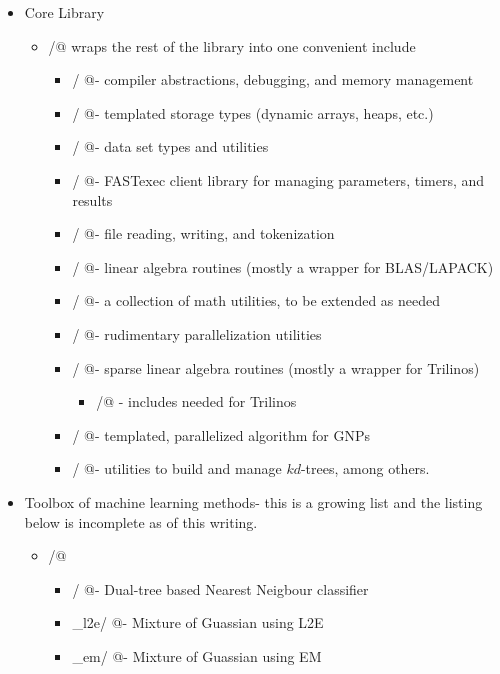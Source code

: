 \documentclass[letter]{report}
\begin{document}
\begin{itemize}

\item Core Library
  \begin{itemize}
  \item \verb@fastlib/@ wraps the rest of the library into one convenient include
    \begin{itemize}
    \item \verb@base/   @- compiler abstractions, debugging, and memory management
    \item \verb@col/    @- templated storage types (dynamic arrays, heaps, etc.)
    \item \verb@data/   @- data set types and utilities
    \item \verb@fx/     @- FASTexec client library for managing parameters, timers, and results
    \item \verb@file/   @- file reading, writing, and tokenization
    \item \verb@la/     @- linear algebra routines (mostly a wrapper for BLAS/LAPACK)
    \item \verb@math/   @- a collection of math utilities, to be extended as needed
    \item \verb@par/    @- rudimentary parallelization utilities
    \item \verb@sparse/ @- sparse linear algebra routines (mostly a wrapper for Trilinos)
      \begin{itemize}
      \item \verb@trilinos/@ - includes needed for Trilinos
      \end{itemize}
    \item \verb@thor/   @- templated, parallelized algorithm for GNPs
    \item \verb@tree/   @- utilities to build and manage $kd$-trees, among others.
    \end{itemize}
  \end{itemize}
\item Toolbox of machine learning methods- this is a growing list and the listing below is incomplete as of this writing.
  \begin{itemize}
  \item \verb@MLPACK/@ 
    \begin{itemize}
      \item \verb@allknn/      @- Dual-tree based Nearest Neigbour classifier
      \item \verb@mog_l2e/     @- Mixture of Guassian using L2E
      \item \verb@mog_em/      @- Mixture of Guassian using EM

\end{itemize}
\end{itemize}
\end{itemize}
\end{document}
